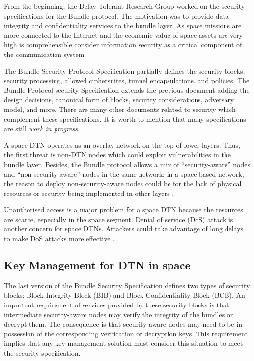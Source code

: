  From the beginning, the Delay-Tolerant Research Group worked on the security specifications for the Bundle protocol. The motivation was to provide data integrity and confidentiality services to the bundle layer. As space missions are more connected to the Internet and the economic value of space assets are very high is comprehensible consider information security as a critical component of the communication system.
 
 The Bundle Security Protocol Specification \cite{rfc6257} partially defines the security blocks, security processing, allowed ciphersuites, tunnel encapsulations, and policies. The Bundle Protocol security Specification \cite{ietf-dtn-bpsec-07} extends the previous document adding the design decisions, canonical form of blocks, security considerations, adversary model, and more. There are many other documents related to security which complement these specifications.  It is worth to mention that many specifications are still \textit{work in progress}.
 

A space DTN operates as an overlay network on the top of lower layers. Thus, the first threat is non-DTN nodes which could exploit vulnerabilities in the bundle layer. Besides, the Bundle protocol allows a mix of ``security-aware'' nodes and ``non-security-aware'' nodes in the same network; in a space-based network, the reason to deploy non-security-aware nodes could be for the lack of physical resources or security being implemented in other layers \cite{rfc6257}. 

Unauthorised access is a major problem for a space DTN because the resources are scarce, especially in the space segment. Denial of service (DoS) attack is another concern for space DTNs. Attackers could take advantage of long delays to make DoS attacks more effective \cite{rfc6257}. 

 
\subsection{Key Management for DTN in space}

The last version of the Bundle Security Specification \cite{ietf-dtn-bpsec-07} defines two types of security blocks: Block Integrity Block (BIB) and Block Confidentiality Block (BCB).  An important requirement of services provided by these security blocks is that intermediate security-aware nodes may verify the integrity of the bundles or decrypt them. The consequence is that security-aware-nodes may need to be in possession of the corresponding verification or decryption keys. This requirement implies that any key management solution must consider this situation to meet the security specification. 


